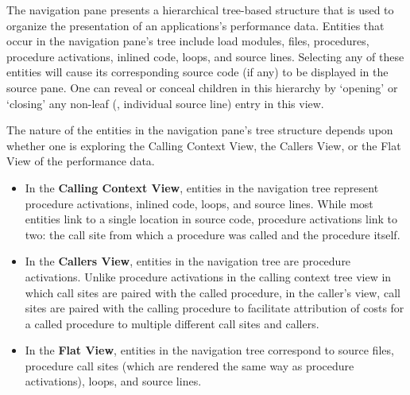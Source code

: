 The navigation pane presents a hierarchical tree-based structure that is used to organize the presentation of an applications's performance data.
Entities that occur in the navigation pane's tree include load modules, files, procedures, procedure activations, inlined code, loops, and source lines.
Selecting any of these entities will cause its corresponding source code (if any) to be displayed in the source pane.
One can reveal or conceal children in this hierarchy by `opening' or `closing' any non-leaf (\ie{}, individual source line) entry in this view.


The nature of the entities in the navigation pane's tree structure depends upon whether one is exploring the Calling Context View, the Callers View, or the Flat View of the performance data.
\begin{itemize}
\item In the \textbf{Calling Context View}, entities in the navigation tree represent procedure activations, inlined code, loops, and source lines.
  While most entities link to a single location in source code, procedure activations link to two: the call site from which a procedure was called and the procedure itself.

\item In the \textbf{Callers View}, entities in the navigation tree are procedure activations.
  Unlike procedure activations in the calling context tree view in which call sites are paired with the called procedure, in the caller's view, call sites are paired with the calling procedure to facilitate attribution of costs for a called procedure to multiple different call sites and callers.

\item In the \textbf{Flat View}, entities in the navigation tree correspond to source files, procedure call sites (which are rendered the same way as procedure activations), loops, and source lines.
\end{itemize}



